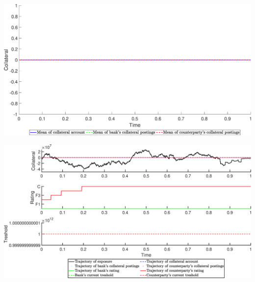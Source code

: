 \begin{landscape}
\includegraphics[width=.95\columnwidth]{CollateralUC/CollateralUC_FOBB_1}
\end{landscape}
\begin{landscape}
\includegraphics[width=.95\columnwidth]{CollateralUC/CollateralUC_FOBB_2}
\end{landscape}
